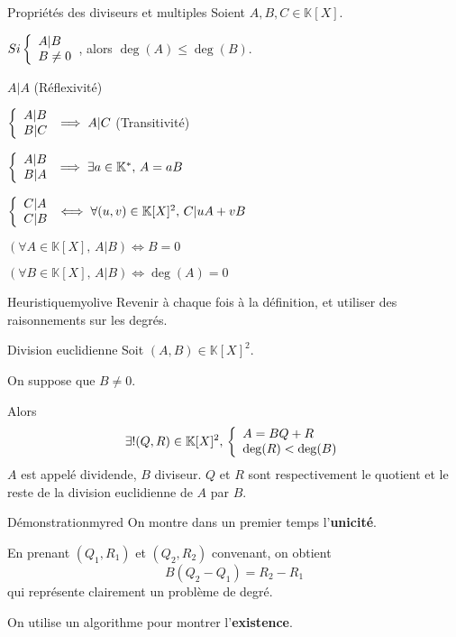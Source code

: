     \begin{prop}{Propriétés des diviseurs et multiples}{}
        Soient $A,B,C \in \mathbb{K}[X]$.
    
        \begin{alors}
            \item $ Si \et{A | B}{B \neq 0}$, alors $\deg(A) \leq \deg(B)$.
            \item $A | A$ (Réflexivité)
            \item $\et{A | B}{B | C} \implies A | C$ (Transitivité)
            \item $\et{A | B}{B | A} \implies \exists a \in \mathbb{K}^*, \, A =aB$
            \item $\et{C|A}{C|B} \iff \forall (u,v) \in \mathbb{K}[X]^2, \, C | uA + vB$
            \item $(\forall A \in \mathbb{K}[X], \, A | B) \iff B =0$
            \item $(\forall B \in \mathbb{K}[X], \, A | B) \iff \deg(A) = 0$
        \end{alors}
    \end{prop}
    
    \begin{demo}{Heuristique}{myolive}
        Revenir à chaque fois à la définition, et utiliser des raisonnements sur les degrés.
    \end{demo}

    \begin{theo}{Division euclidienne}{}
        Soit $(A,B) \in \mathbb{K}[X]^2$. 
    
        On suppose que $B \neq 0$.
    
        Alors \[ \exists ! (Q,R) \in \mathbb{K}[X]^2, \, \et{A = BQ + R}{\deg(R) < \deg(B)} \]
        $A$ est appelé dividende, $B$ diviseur. $Q$ et $R$ sont respectivement le quotient et le reste de la division euclidienne de $A$ par $B$.
    \end{theo}
    
    \begin{demo}{Démonstration}{myred}
        On montre dans un premier temps l’\textbf{unicité}.
        
        En prenant $(Q_1,R_1)$ et $(Q_2,R_2)$ convenant, on obtient \[ B(Q_2-Q_1) = R_2 - R_1 \] qui représente clairement un problème de degré.
        
        On utilise un algorithme pour montrer l’\textbf{existence}.
    \end{demo}
    
